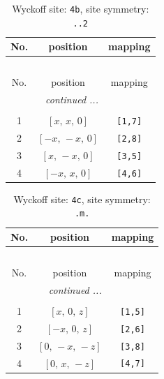 \documentclass[fleqn,8pt]{jsarticle}
\begin{document}
\begin{longtable}{ccc}
\caption{Wyckoff site: {\tt 4b}, site symmetry: {\tt ..2}}
 \\
 \hline \hline
No. & position & mapping \\ \hline \endfirsthead

\multicolumn{2}{l}{\tablename\ \thetable{}} \\
 \hline \hline
No. & position & mapping \\ \hline \endhead

 \hline \hline
\multicolumn{2}{r}{\footnotesize\it continued ...} \\ \endfoot

 \hline \hline
\multicolumn{2}{r}{} \\ \endlastfoot

1 & $\left[ x,\, x,\, 0 \right]$ & {\tt [1,7]} \\ \hline
2 & $\left[ - x,\, - x,\, 0 \right]$ & {\tt [2,8]} \\ \hline
3 & $\left[ x,\, - x,\, 0 \right]$ & {\tt [3,5]} \\ \hline
4 & $\left[ - x,\, x,\, 0 \right]$ & {\tt [4,6]} \\
\end{longtable}
\renewcommand{\arraystretch}{1.2}
\begin{longtable}{ccc}
\caption{Wyckoff site: {\tt 4c}, site symmetry: {\tt .m.}}
 \\
 \hline \hline
No. & position & mapping \\ \hline \endfirsthead

\multicolumn{2}{l}{\tablename\ \thetable{}} \\
 \hline \hline
No. & position & mapping \\ \hline \endhead

 \hline \hline
\multicolumn{2}{r}{\footnotesize\it continued ...} \\ \endfoot

 \hline \hline
\multicolumn{2}{r}{} \\ \endlastfoot

1 & $\left[ x,\, 0,\, z \right]$ & {\tt [1,5]} \\ \hline
2 & $\left[ - x,\, 0,\, z \right]$ & {\tt [2,6]} \\ \hline
3 & $\left[ 0,\, - x,\, - z \right]$ & {\tt [3,8]} \\ \hline
4 & $\left[ 0,\, x,\, - z \right]$ & {\tt [4,7]} \\
\end{longtable}
\renewcommand{\arraystretch}{1.2}
\end{document}
